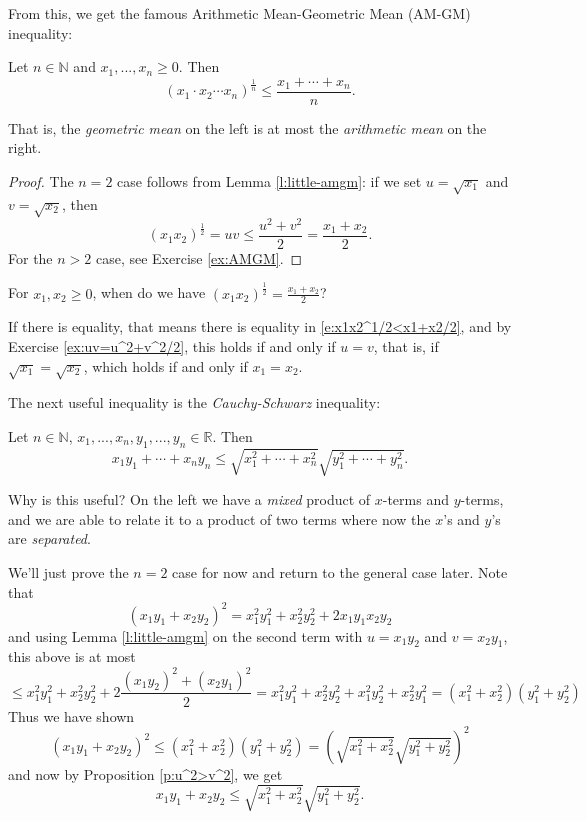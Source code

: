 \documentclass[11pt,dvipsnames]{book}
\numberwithin{figure}{section} %
\numberwithin{table}{section} %
\begin{document}
From this, we get the famous {Arithmetic Mean-Geometric Mean (AM-GM) inequality}:

\begin{theorem}[AM-GM Inequality]
\label{t:AM-GM}
Let $n\in\mathbb{N}$ and $x_{1},...,x_{n}\geq 0$. Then
\[
(x_{1}\cdot x_{2}\cdots x_{n})^{\frac{1}{n}}\leq \frac{x_{1}+\cdots + x_{n}}{n}.
\]
\end{theorem}
That is, the {\it geometric mean} on the left is at most the {\it arithmetic mean} on the right.

\begin{proof}
The $n=2$ case follows from Lemma \ref{l:little-amgm}: if we set $u=\sqrt{x_{1}}$ and $v=\sqrt{x_{2}}$, then
\begin{equation}
\label{e:x1x2^1/2<x1+x2/2}
(x_{1}x_{2})^{\frac{1}{2}}=uv\leq \frac{u^2+v^2}{2} = \frac{x_{1}+x_{2}}{2}.
\end{equation}
For the $n>2$ case, see Exercise \ref{ex:AMGM}.
\end{proof}

\begin{exercise}
For $x_{1},x_{2}\geq 0$, when do we have $(x_{1}x_{2})^{\frac{1}{2}}= \frac{x_{1}+x_{2}}{2}$?
\end{exercise}

\begin{solution}
If there is equality, that means there is equality in \eqref{e:x1x2^1/2<x1+x2/2}, and by Exercise \ref{ex:uv=u^2+v^2/2}, this holds if and only if $u=v$, that is, if $\sqrt{x_{1}}=\sqrt{x_{2}}$, which holds if and only if $x_{1}=x_{2}$.
\end{solution}

The next useful inequality is the {\it Cauchy-Schwarz} inequality:

\begin{theorem}
Let $n\in\mathbb{N}$,  $x_{1},...,x_{n},y_{1},...,y_{n}\in\mathbb{R}$. Then
\[
x_{1}y_{1}+\cdots + x_{n}y_{n}
\leq \sqrt{x_{1}^2+\cdots + x_{n}^{2}} \sqrt{y_{1}^2+\cdots + y_{n}^{2}} .
\]

\end{theorem}

Why is this useful? On the left we have a {\it mixed} product of $x$-terms and $y$-terms, and we are able to relate it to a product of two terms where now the $x$'s and $y$'s are {\it separated}.

We'll just prove the $n=2$ case for now and return to the general case later. Note that
\[
(x_{1}y_{1}+x_{2}y_{2})^2
=x_{1}^2y_{1}^2+x_{2}^2y_{2}^2+2x_{1}y_{1}x_{2}y_{2}
\]
and using Lemma \ref{l:little-amgm} on the second term with $u=x_{1}y_{2}$ and $v=x_{2}y_{1}$, this above is at most
\[
\leq x_{1}^2y_{1}^2+x_{2}^2y_{2}^2+2\frac{(x_{1}y_{2})^2+(x_{2}y_{1})^2}{2}
=x_{1}^2y_{1}^2+x_{2}^2y_{2}^2+x_{1}^2y_{2}^2+x_{2}^2y_{1}^2
=(x_{1}^2+x_{2}^2)(y_{1}^2+y_{2}^2)
\]
Thus we have shown
\[
(x_{1}y_{1}+x_{2}y_{2})^2\leq (x_{1}^2+x_{2}^2)(y_{1}^2+y_{2}^2)
=\left(\sqrt{x_{1}^2+x_{2}^2}\sqrt{y_{1}^2+y_{2}^2}\right)^{2}
\]
and now by Proposition \ref{p:u^2>v^2}, we get
\[
x_{1}y_{1}+x_{2}y_{2}\leq\sqrt{x_{1}^2+x_{2}^2}\sqrt{y_{1}^2+y_{2}^2}.
\]
\end{document}
